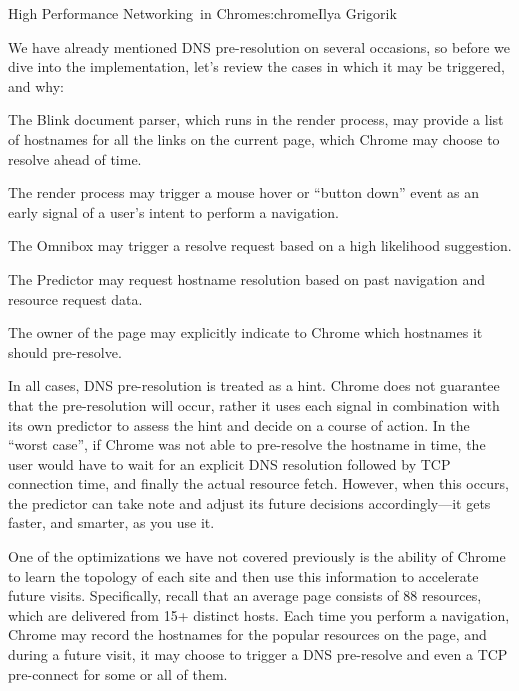 \begin{aosachapter}{High Performance Networking~in Chrome}{s:chrome}{Ilya Grigorik}

We have already mentioned DNS pre-resolution on several occasions, so
before we dive into the implementation, let's review the cases in which
it may be triggered, and why:

\begin{aosaitemize}

\item
  The Blink document parser, which runs in the render process, may
  provide a list of hostnames for all the links on the current page,
  which Chrome may choose to resolve ahead of time.
\item
  The render process may trigger a mouse hover or ``button down'' event
  as an early signal of a user's intent to perform a navigation.
\item
  The Omnibox may trigger a resolve request based on a high likelihood
  suggestion.
\item
  The Predictor may request hostname resolution based on past navigation
  and resource request data.
\item
  The owner of the page may explicitly indicate to Chrome which
  hostnames it should pre-resolve.
\end{aosaitemize}

In all cases, DNS pre-resolution is treated as a hint. Chrome does not
guarantee that the pre-resolution will occur, rather it uses each signal
in combination with its own predictor to assess the hint and decide on a
course of action. In the ``worst case'', if Chrome was not able to
pre-resolve the hostname in time, the user would have to wait for an
explicit DNS resolution followed by TCP connection time, and finally the
actual resource fetch. However, when this occurs, the predictor can take
note and adjust its future decisions accordingly---it gets faster, and
smarter, as you use it.

One of the optimizations we have not covered previously is the ability
of Chrome to learn the topology of each site and then use this
information to accelerate future visits. Specifically, recall that an
average page consists of 88 resources, which are delivered from 15+
distinct hosts. Each time you perform a navigation, Chrome may record
the hostnames for the popular resources on the page, and during a future
visit, it may choose to trigger a DNS pre-resolve and even a TCP
pre-connect for some or all of them.



\end{aosachapter}

